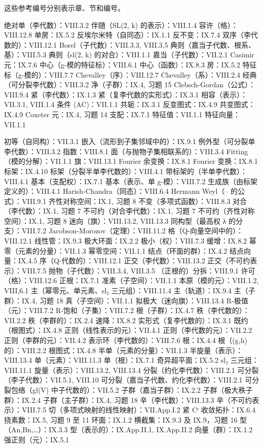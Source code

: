 
这些参考编号分别表示章、节和编号。

绝对单（李代数）：VIII.3.2 伴随（SL(2, k) 的表示）：VIII.1.4 容许（格）：VIII.12.8 单房：IX.5.2 反埃尔米特（自同态）：IX.1.1 反不变：IX.7.4 双序（李代数的）：VIII.12.1 Borel（子代数）：VIII.3.3, VIII.3.5 典则（嘉当子代数、根系、基）：VIII.5.3 典则（sl(2, k) 的对合）：VIII.1.1 嘉当（子代数）：VII.2.1 Casimir 元：IX.7.6 中心（g-模的特征标）：VIII.6.1 中心（函数）：IX.8.3 房：IX.5.2 特征标（g-模的）：VIII.7.7 Chevalley（序）：VIII.12.7 Chevalley（系）：VIII.2.4 经典（可分裂李代数）：VIII.3.2 净（子群）：IX.4, 习题 15 Clebsch-Gordan（公式）：VIII.9.4 紧（李代数）：IX.1.3 紧（复李代数的实形式）：IX.3.1 相容（表示）：VII.3.1, VIII.1.4 条件 (AC)：VII.1.1 共轭：IX.3.1 反变图式：IX.4.9 共变图式：IX.4.9 Coxeter 元：IX.4, 习题 14 支配：IX.7.1 特征值：VII.1.1 特征向量：VII.1.1

初等（自同构）：VII.3.1 嵌入（流形到子集邻域中的）：IX.9.1 例外型（可分裂单李代数）：VIII.3.2 指数：VIII.8.1 面（与抛物子集相联系的）：VIII.3.4 Fitting（模的分解）：VII.1.1 旗：VIII.13.1 Fourier 余变换：IX.8.1 Fourier 变换：IX.8.1 标架：IX.4.10 标架（分裂半单李代数的）：VIII.4.1 带标架的（半单李代数）：VIII.4.1 基本（支配权）：IX.7.1 基本（表示、单 g-模）：VIII.7.2 生成族（由标架定义的）：VIII.4.1 Harish-Chandra（同态）：VIII.6.4 Hermann Weyl（-- 的公式）：VIII.9.1 齐性对称空间：IX.1, 习题 8 不变（多项式函数）：VIII.8.3 对合（李代数）：IX.1, 习题 7 不可约（对合李代数）：IX.1, 习题 7 不可约（齐性对称空间）：IX.1, 习题 8 迷向（旗）：VIII.13.2, VIII.13.3 同构型（最高权 λ 的分支）：VIII.7.2 Jacobson-Morozov（定理）：VIII.11.2 格（Q-向量空间中的）：VIII.12.1 线性管：IX.9.3 极大环面：IX.2.2 极小（权）：VIII.7.3 缓增：IX.8.2 幂零（元素的分量）：VII.1.3 幂零空间：VII.1.1 结点（环面的群）：IX.4.2 结点向量：IX.4.5 序（Q-代数的）：VIII.12.1 正交（李代数）：VIII.13.2 正交（不可约表示）：VIII.7.5 抛物（子代数）：VIII.3.4, VIII.3.5 （正根的）分拆：VIII.9.1 许可（格）：VIII.12.6 正根：IX.7.1 准素（子空间）：VII.1.1 本原（模的元）：VIII.1.2, VIII,6.1 主（幂零元、单元素、sl₂ 三元组）：VIII.11.4 主（轨道）：IX.9.4 主（子群）：IX.4, 习题 18 真（子空间）：VII.1.1 拟极大（迷向旗）：VIII.13.4 R-极值（元）：VIII.7.2 R-饱和（子集）：VIII.7.2 根（子群）：IX.4.7 秩（李代数的）：VII.2.2 秩（李群的）：IX.2.4 速降：IX.8.2 实形式（复李代数的）：IX.3.1 既约（根图式）：IX.4.8 正则（线性表示的元）：VII.4.1 正则（李代数的元）：VII.2.2 正则（李群的元）：VII.4.2 表示环（李代数的）：VIII.7.6 根：IX.4.4 根（(g,h) 的）：VIII.2.2 根图式：IX.4.8 半单（元素的分量）：VII.1.3 半旋量（表示）：VIII.13.4 单（元素）：VIII.11.3 单（根）：IX.7.1 奇异超平面：IX.5.2 sl₂ 三元组：VIII.11.1 旋量（表示）：VIII.13.2, VIII.13.4 分裂（约化李代数）：VIII.2.1 可分裂（李子代数）：VII.5.1, VIII.10 可分裂（嘉当子代数、约化李代数）：VIII.2.1 可分裂包络（gl(V) 中子代数的）：VII.5.2 子群（嘉当子群）：IX.2.2 子群（极大秩子群）：IX.2.4 子群（主子群）：IX.4, 习题 18 辛（李代数）：VIII.13.3 辛（不可约表示）：VIII.7.5 切（多项式映射的线性映射）：VII.App.I.2 紧 Cʳ 收敛拓扑：IX.6.4 挠素数：IX.5, 习题 9 至 11 环面：IX.1.2 横截集：IX.9.3 及 IX.9，习题 16 型（An,Bn,\ldots）：IX.3.3 型（表示的）：IX.App.II.1, IX.App.II.2 向量（群）：IX.1.2 强正则（元）：IX.5.1

